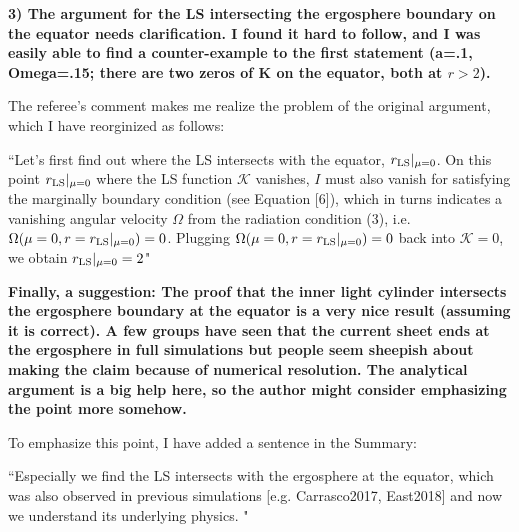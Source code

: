 \documentclass[10pt]{article}
\begin{document}
{\bf 3) The argument for the LS intersecting the ergosphere boundary on the equator needs
clarification. I found it hard to follow, and I was easily able to find a counter-example to the first
statement (a=.1, Omega=.15; there are two zeros of K on the equator, both at $r>2$). }

The referee's comment makes me realize the problem of the original argument, which I have reorginized as follows:

``Let's first find out where the LS intersects with the equator, $r_{\rm LS}|_{\mu=0}$.
On this point $r_{\rm LS}|_{\mu=0}$ where the LS function $\mathcal K$ vanishes,
$I$ must also vanish for satisfying the marginally boundary condition (see Equation [6]),
which in turns indicates a vanishing angular velocity $\Omega$ from
the radiation condition (3), i.e. $\Omega(\mu=0, r= r_{\rm LS}|_{\mu=0}) =0$.
Plugging $\Omega(\mu=0, r= r_{\rm LS}|_{\mu=0}) =0$ back into $\mathcal K = 0$,
we obtain $r_{\rm LS}|_{\mu=0}=2$"

{\bf Finally, a suggestion:
The proof that the inner light cylinder intersects the ergosphere boundary at the equator is
a very nice result (assuming it is correct). A few groups have seen that the current sheet
ends at the ergosphere in full simulations but people seem sheepish about making the claim
because of numerical resolution. The analytical argument is a big help here, so the author
might consider emphasizing the point more somehow.}

To emphasize this point, I have added a sentence in the Summary:

``Especially we find the LS
intersects with the ergosphere at the equator, which was also observed in previous simulations
[e.g. Carrasco2017, East2018] and now we understand its underlying physics. "
\end{document}
